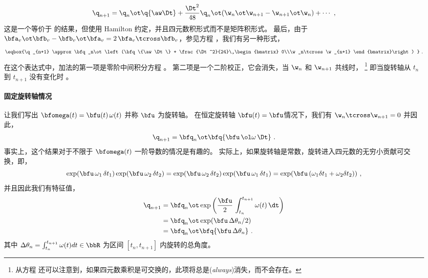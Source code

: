%
\begin{align}
\q_{n+1} = \q_n\ot\q\{\aw\Dt\} + \frac{\Dt^2}{48}\q_n\ot(\w_n\ot\w_{n+1} - \w_{n+1}\ot\w_n) + \cdots ~,
\label{equ:intFirstA}
\end{align}
%
这是一个等价于 \citep{TRAWNY-05-QUAT}的结果，但使用 Hamilton 约定，并且四元数积形式而不是矩阵积形式。 
最后，由于 $\bfa_v\ot\bfb_v-\bfb_v\ot\bfa_v=2\,\bfa_v\tcross\bfb_v$，参见方程 ，我们有另一种形式，
%
%
\begin{align} \label{equ:intFirstB}
\eqbox{\q_{n+1} \approx \bfq_n\ot\left(\bfq\{\aw\Dt\} + \frac{\Dt^2}{24}\,\begin{bmatrix}
0\\\w_n\tcross\w_{n+1}
\end{bmatrix}\right)
}~.
\end{align}
%
在这个表达式中，加法的第一项是零阶中间积分方程 。
第二项是一个二阶校正，它会消失，当 $\w_n$ 和 $\w_{n+1}$ 共线时，%
\footnote{从方程  还可以注意到，如果四元数乘积是可交换的，此项将总是(\emph{always})消失，而不会存在。}
即当旋转轴从 $t_n$ 到 $t_{n+1}$ 没有变化时 。


\paragraph{固定旋转轴情况}

让我们写出 $\bfomega(t)=\bfu(t)\,\omega(t)$ 并称 $\bfu$ 为旋转轴。
在恒定旋转轴 $\bfu(t) = \bfu$情况下，我们有 $\w_n\tcross\w_{n+1}=0$ 并因此，
%
\begin{align}\label{equ:first_order_constant_axis}
\q_{n+1} = \bfq_n\ot\bfq\{\bfu\,\ol\omega\,\Dt\}~.
\end{align}
%
事实上，这个结果对于不限于 $\bfomega(t)$ 一阶导数的情况是有趣的。
实际上，如果旋转轴是常数，旋转进入四元数的无穷小贡献可交换，即， 
%
$$\exp (\bfu\,\omega_1\,\delta t_1)\exp (\bfu\,\omega_2\,\delta t_2)=\exp (\bfu\,\omega_2\,\delta t_2)\exp (\bfu\,\omega_1\,\delta t_1)=\exp (\bfu\,(\omega_1\delta t_1 + \omega_2\delta t_2))~,$$ 
%
并且因此我们有特征值，
%
\begin{subequations}
\begin{align}
\q_{n+1} 
  &= \bfq_n\ot \exp\left(\frac{\bfu}2\,\int_{t_n}^{t_{n+1}}\omega(t)\,\dt\right) \\
  &= \bfq_n\ot \exp(\bfu\,\Delta\theta_n/2) \\
  &= \bfq_n\ot \bfq\{\bfu\,\Delta\theta_n\}~.
\end{align}
\end{subequations}
%
其中 $\Delta\theta_n = \int_{t_n}^{t_{n+1}} \omega(t)dt \in \bbR$ 为区间 $[t_n,t_{n+1}]$ 内旋转的总角度。



